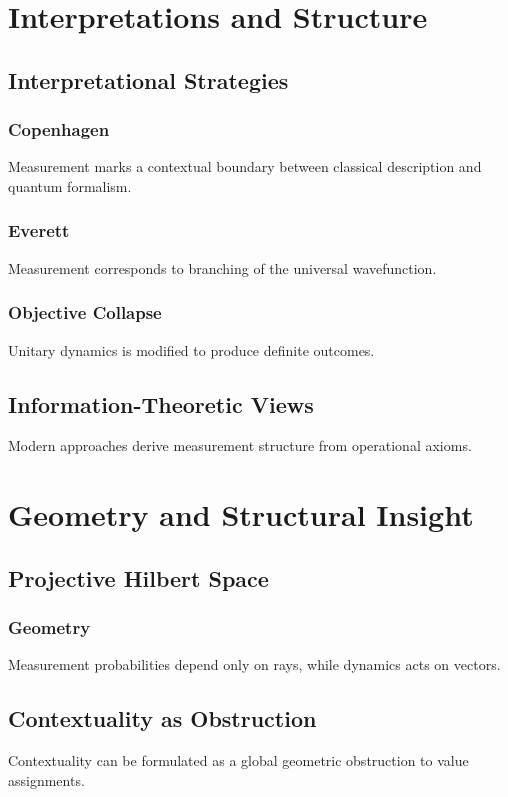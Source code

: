 \documentclass[12pt]{book}
\theoremstyle{plain}
\theoremstyle{definition}
\theoremstyle{remark}
\begin{document}
\part{Interpretations and Structure}

\chapter{Interpretational Strategies}

\section{Copenhagen}
Measurement marks a contextual boundary between classical description and quantum formalism.

\section{Everett}
Measurement corresponds to branching of the universal wavefunction.

\section{Objective Collapse}
Unitary dynamics is modified to produce definite outcomes.

\chapter{Information-Theoretic Views}
Modern approaches derive measurement structure from operational axioms.

\part{Geometry and Structural Insight}

\chapter{Projective Hilbert Space}

\section{Geometry}
Measurement probabilities depend only on rays, while dynamics acts on vectors.

\chapter{Contextuality as Obstruction}
Contextuality can be formulated as a global geometric obstruction to value assignments.
\end{document}
